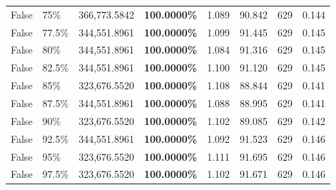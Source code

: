 \begin{table}[H]
\begin{tabular}{|m{}| m{}| r | R{0.13\textwidth}| R{0.09\textwidth}| R{0.09\textwidth}| R{0.09\textwidth}| R{0.11\textwidth}|}
False & 75\% & 366,773.5842 & \bfseries \color{red} 100.0000\% & 1.089 & 90.842 & 629 & 0.144 \\
 
False & 77.5\% & 344,551.8961 & \bfseries \color{red} 100.0000\% & 1.099 & 91.445 & 629 & 0.145 \\
 
False & 80\% & 344,551.8961 & \bfseries \color{red} 100.0000\% & 1.084 & 91.316 & 629 & 0.145 \\
 
False & 82.5\% & 344,551.8961 & \bfseries \color{red} 100.0000\% & 1.100 & 91.120 & 629 & 0.145 \\
 
False & 85\% & 323,676.5520 & \bfseries \color{red} 100.0000\% & 1.108 & 88.844 & 629 & 0.141 \\
 
False & 87.5\% & 344,551.8961 & \bfseries \color{red} 100.0000\% & 1.088 & 88.995 & 629 & 0.141 \\
 
False & 90\% & 323,676.5520 & \bfseries \color{red} 100.0000\% & 1.102 & 89.085 & 629 & 0.142 \\
 
False & 92.5\% & 344,551.8961 & \bfseries \color{red} 100.0000\% & 1.092 & 91.523 & 629 & 0.146 \\
 
False & 95\% & 323,676.5520 & \bfseries \color{red} 100.0000\% & 1.111 & 91.695 & 629 & 0.146 \\
 
False & 97.5\% & 323,676.5520 & \bfseries \color{red} 100.0000\% & 1.102 & 91.671 & 629 & 0.146 \\
 
\bottomrule
\end{tabular}%
\end{table}
